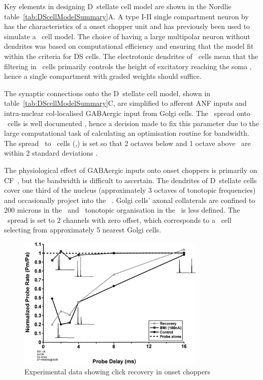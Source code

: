Key elements in designing D~stellate cell model are shown in the Nordlie table~\ref{tab:DScellModelSummary}A.
A type I-II single compartment neuron by \citet{RothmanManis:2003b} has the characteristics of a onset chopper unit and has previously been used to simulate a \DS~cell model.
The choice of having a large multipolar neuron without dendrites was based on computational efficiency and ensuring that the model fit within the criteria for DS cells.
The electrotonic dendrites of \DS~cells mean that the filtering in \DS~cells primarily controls the height of excitatory {\PSPs} reaching the soma \citep{WhiteYoungEtAl:1994}, hence a single compartment with graded weights should suffice.


The synaptic connections onto the D~stellate cell model, shown in table~\ref{tab:DScellModelSummary}C, are simplified to afferent ANF inputs and intra-nuclear col-localised GABAergic input from Golgi cells.
The \ANF~spread onto \DS~cells is well documented \citep{PaoliniClark:1999,ArnottWallaceEtAl:2004,PalmerWallaceEtAl:2003,JiangPalmerEtAl:1996,PalmerJiangEtAl:1996}, hence a decision made to fix this parameter due to the large computational task of calculating an optimisation routine for \ANFDS bandwidth.
The spread \ANF~to \DS~cells (\sANFDSh,\sANFDSl) is set so that 2 octaves below and 1 octave above \CF~are within 2 standard deviations \citep{PaoliniClark:1999}.


The physiological effect of GABAergic inputs onto onset choppers is primarily on CF~\citep{CasparyHaveyEtAl:1979,PalombiCaspary:1992,CasparyBackoffEtAl:1994,CasparyPalombi:1993,CasparyPalombiEtAl:1993}, but the bandwidth is difficult to ascertain.
The dendrites of D~stellate cells cover one third of the nucleus (approximately 3 octaves of tonotopic frequencies) and occasionally project into the \GCD~\citep{ArnottWallaceEtAl:2004}.
Golgi cells' axonal collaterals are confined to 200 microns in the \GCD~and \ANF~tonotopic organisation in the \GCD~is less defined.
The \GLGDS~spread is set to 2 channels with zero offset, which corresponds to a \DS~cell selecting from approximately 5 nearest Golgi cells.

\begin{figure}[htb]
  \centering
\includegraphics[keepaspectratio,width=0.8\textwidth]{gfx/Backoff+Palombi-Fig3}
  \caption{Experimental data showing click recovery in onset choppers}\label{fig:BackoffPalombi}
\end{figure}

